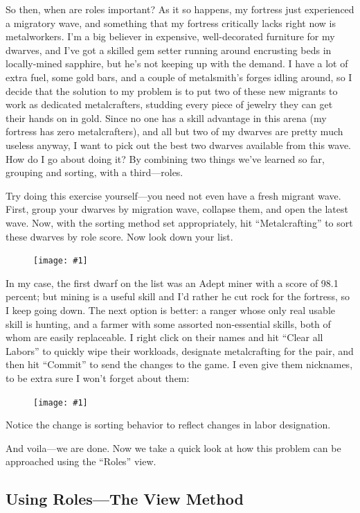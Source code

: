 \documentclass[]{article}
\newcommand{\fullfigure}[1] {
\begin{figure}[h!]
\texttt{[image: \#1]}
\end{figure}
}
\newcommand{\fullfigurecaption}[1] {
\begin{center}
\vspace{-12pt}
#1
\end{center}
}
\begin{document}
So then, when are roles important? As it so happens, my fortress just experienced a migratory wave, and
something that my fortress critically lacks right now is metalworkers. I'm a big believer in expensive,
well-decorated furniture for my dwarves, and I've got a skilled gem setter running around encrusting beds
in locally-mined sapphire, but he's not keeping up with the demand. I have a lot of extra fuel, some gold
bars, and a couple of metalsmith's forges idling around, so I decide that the solution to my problem is
to put two of these new migrants to work as dedicated metalcrafters, studding every piece of jewelry they
can get their hands on in gold. Since no one has a skill advantage in this arena (my fortress has zero
metalcrafters), and all but two of my dwarves are pretty much useless anyway, I want to pick out the best
two dwarves available from this wave. How do I go about doing it? By combining two things we've learned
so far, grouping and sorting, with a third---roles.

Try doing this exercise yourself---you need not even have a fresh migrant wave. First, group your dwarves
by migration wave, collapse them, and open the latest wave. Now, with the sorting method set
appropriately, hit ``Metalcrafting'' to sort these dwarves by role score. Now look down your list.

\fullfigure{Sec3Fig5}

In my case, the first dwarf on the list was an Adept miner with a score of 98.1 percent; but mining is a
useful skill and I'd rather he cut rock for the fortress, so I keep going down. The next option is
better: a ranger whose only real usable skill is hunting, and a farmer with some assorted non-essential
skills, both of whom are easily replaceable. I right click on their names and hit ``Clear all Labors'' to
quickly wipe their workloads, designate metalcrafting for the pair, and then hit ``Commit'' to send the
changes to the game. I even give them nicknames, to be extra sure I won't forget about them:

\fullfigure{Sec3Fig6}
\fullfigurecaption{Notice the change is sorting behavior to reflect changes in labor designation.}

And voila---we are done. Now we take a quick look at how this problem can be approached using the
``Roles'' view.

\newpage
\subsection{Using Roles---The View Method}
\label{sec:Using Roles---The View Method}
\end{document}

